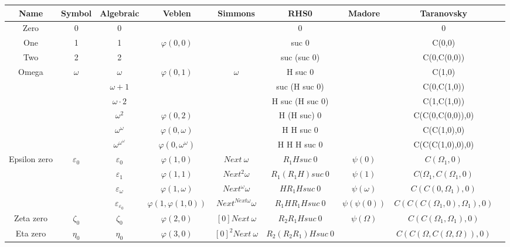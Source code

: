 \documentclass[10pt]{article}
\begin{document}
\begin{tabular}{|c|c|c|c|c|c|c|c|c|}
\hline
Name		& Symbol		& Algebraic			& Veblen			& Simmons			& RHS0 		& Madore				& Taranovsky 			\\
\hline
Zero		& 0			& 0				& 				& 				& 0			& 					& 0				\\ \hline
One		& 1			& 1				& \(\varphi(0,0)\)		& 				& suc 0			& 					& C(0,0)			\\ \hline
Two		& 2			& 2				& 				& 				& suc (suc 0)		& 					& C(0,C(0,0))			\\ \hline
Omega		& \(\omega\)		& \(\omega\)			& \(\varphi(0,1)\)		& \(\omega\)			& H suc 0		& 					& C(1,0)			\\ \hline
		& 			& \(\omega+1\)			& 				& 				& suc (H suc 0)		& 					& C(0,C(1,0))			\\ \hline
		&			& \(\omega\cdot2\)		&				& 				& H suc (H suc 0)	& 					& C(1,C(1,0))			\\ \hline
		&			& \(\omega^2\)			& \(\varphi(0,2)\)		& 				& H (H suc) 0		& 					& C(C(0,C(0,0)),0)		\\ \hline
		&			& \(\omega^\omega\)		& \(\varphi(0,\omega)\)		& 				& H H suc 0		& 					& C(C(1,0),0)			\\ \hline
		&			& \(\omega^{\omega^\omega}\)	& \(\varphi(0,\omega^\omega)\)	&				& H H H suc 0		&					& C(C(C(1,0),0),0)		\\ \hline
Epsilon zero	& \(\varepsilon_0\)	& \(\varepsilon_0\)		& \(\varphi(1,0)\)		& \(Next\ \omega\)		& \(R_1 H suc\ 0\)	& \(\psi(0)\)				& \(C(\Omega_1,0)\)		\\ \hline
		& 			& \(\varepsilon_1\)		& \(\varphi(1,1)\)		& \(Next^2 \omega\)	& \(R_1 (R_1 H) suc\ 0\)& \(\psi(1)\)				& \(C(\Omega_1,C(\Omega_1,0)\)	\\ \hline
		& 			& \(\varepsilon_\omega\)	& \(\varphi(1,\omega)\) 	& \(Next^\omega \omega\) & \(H R_1 H suc\ 0\)	& \(\psi(\omega)\)			& \(C(C(0,\Omega_1),0)\)	\\ \hline
		& 			&\(\varepsilon_{\varepsilon_0}\)& \(\varphi(1,\varphi(1,0))\)	& \(Next^{Next \omega} \omega \) & \(R_1 H R_1 H suc\ 0\)& \(\psi(\psi(0))\)			& \(C(C(C(\Omega_1,0),\Omega_1),0)\)\\ \hline
Zeta zero	& \(\zeta_0\)		& \(\zeta_0\)			& \(\varphi(2,0)\)		& \([0] Next\ \omega\)		& \(R_2 R_1 H suc\ 0\)	& \(\psi(\Omega)\)			& \(C(C(\Omega_1,\Omega_1),0)\)	\\ \hline
Eta zero	& \(\eta_0\)		& \(\eta_0\)			& \(\varphi(3,0)\)		& \([0]^2 Next\ \omega\) 	& \(R_2 (R_2 R_1) H suc\ 0\)&					& \(C(C(\Omega,C(\Omega,\Omega)),0)\) \\ \hline

\end{tabular}
\end{document}
